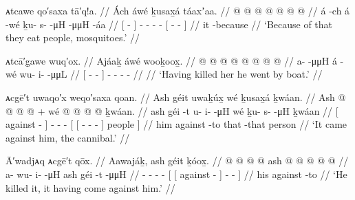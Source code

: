 \ex\label{ex:91-274-eat-people-mosquitoes}%
%
\begingl
	\glpreamble	ᴀtcawe qo′saxa tā′q!a. //
	\glpreamble	Ách áwé ḵusax̱á táaxʼaa. //
	\gla	{}  @ {} {}  @ {}
		 @ {} @ {} @ {}
		{}  @ {} @ {} {} //
	\glb	{} á -ch {} á -wé
		ḵu- s-  -μH
		{}  -μμH -áa {} //
	\glc	{}[  - {}]  -
		- -  -
		{}[  - - {}] //
	\gld	{} it -because {}  {}
		 {} {} {}
		{}  {} {} {} //
	\glft	‘Because of that they eat people, mosquitoes.’
		//
\endgl
\xe

\ex\label{ex:91-275-killed-went}%
%
\begingl
	\glpreamble	ᴀtcā′g̣awe wuq′ox. //
	\glpreamble	Ajáaḵ áwé wooḵoox̱. //
	\gla	{}  @ {} @ {} @ {} @ {} {}  @ {}
		 @ {} @ {} @ {}  //
	\glb	{} a- {}  -μμH {} {} á -wé
		wu- i-  -μμL //
	\glc	{}[ - \·  - \· {}]
		 -
		- -  - //
	\gld	{}  {} {} {} {} {}  {}
		 {} {} {} //
	\glft	‘Having killed her he went by boat.’
		//
\endgl
\xe

\ex\label{ex:91-276-came-against-cannibal}%
%
\begingl
	\glpreamble	ᴀcgē′t uwaqo′x weqo′saxa qoan. //
	\glpreamble	Ash géit uwaḵúx̱ wé ḵusax̱á ḵwáan. //
	\gla	{} Ash  @ {} {}
		 @ {} @ {} @ {} +
		{} wé {}  @ {} @ {} @ {} @ {} {} ḵwáan. {} //
	\glb	{} ash géi -t {}
		u- i-  -μH
		{} wé {} ḵu- s-  -μH {} {} ḵwáan {} //
	\glc	{}[  against - {}]
		- -  -
		{}[  {}[ - -
			 - \· {}] people {}] //
	\gld	{} him against -to {}
		 {} {} {} 
		{} that {}  {} {} {} -that {} person {} //
	\glft	‘It came against him, the cannibal.’
		//
\endgl
\xe

\ex\label{ex:91-277-he-killed-it}%
%
\begingl
	\glpreamble	Ā′wadjᴀq ᴀcgē′t qōx. //
	\glpreamble	Aawajáḵ, ash géit ḵóox̱. //
	\gla	{} @ {} @ {} @ {} @ {}
		{} {} ash  @ {} {}  @ {} @ {} @ {} @ {} {} //
	\glb	a- wu- i-  -μH
		{} {} ash géi -t {} {}  -μμH {} {} //
	\glc	{}- - -  -
		{}[ {}[  against - {}]
			-  - \· {}] //
	\gld	{} {} {} {} {}
		{} {} his against -to {}  {} {} {} {} {} //
	\glft	‘He killed it, it having come against him.’
		//
\endgl
\xe

